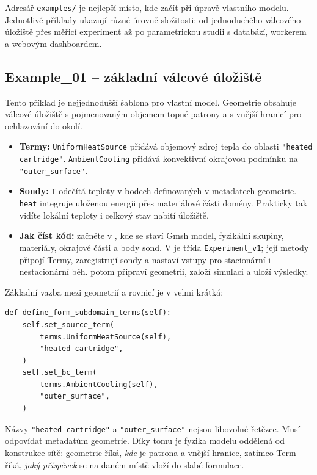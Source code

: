 \documentclass[a4paper,11pt]{article}
\begin{document}
Adresář \texttt{examples/} je nejlepší místo, kde začít při úpravě vlastního
modelu. Jednotlivé příklady ukazují různé úrovně složitosti: od jednoduchého
válcového úložiště přes měřicí experiment až po parametrickou studii s databází,
workerem a webovým dashboardem.

\subsection*{Example\_01 -- základní válcové úložiště}

Tento příklad je nejjednodušší šablona pro vlastní model. Geometrie obsahuje
válcové úložiště s pojmenovaným objemem topné patrony a s vnější hranicí pro
ochlazování do okolí.

\begin{itemize}
  \item \textbf{Termy:} \texttt{UniformHeatSource} přidává objemový zdroj tepla
        do oblasti \texttt{"heated cartridge"}. \texttt{AmbientCooling} přidává
        konvektivní okrajovou podmínku na \texttt{"outer\_surface"}.
  \item \textbf{Sondy:} \texttt{T} odečítá teploty v bodech definovaných v
        metadatech geometrie. \texttt{heat} integruje uloženou energii přes
        materiálové části domény. Prakticky tak vidíte lokální teploty i celkový
        stav nabití úložiště.
  \item \textbf{Jak číst kód:} začněte v , kde se staví Gmsh
        model, fyzikální skupiny, materiály, okrajové části a body sond. V
         je třída \texttt{Experiment\_v1}; její metody připojí
        Termy, zaregistrují sondy a nastaví vstupy pro stacionární i
        nestacionární běh.  potom připraví geometrii,
        založí simulaci a uloží výsledky.
\end{itemize}

Základní vazba mezi geometrií a rovnicí je v  velmi krátká:

\begin{lstlisting}[style=py]
def define_form_subdomain_terms(self):
    self.set_source_term(
        terms.UniformHeatSource(self),
        "heated cartridge",
    )
    self.set_bc_term(
        terms.AmbientCooling(self),
        "outer_surface",
    )
\end{lstlisting}

Názvy \texttt{"heated cartridge"} a \texttt{"outer\_surface"} nejsou libovolné
řetězce. Musí odpovídat metadatům geometrie. Díky tomu je fyzika modelu oddělená
od konstrukce sítě: geometrie říká, \emph{kde} je patrona a vnější hranice,
zatímco Term říká, \emph{jaký příspěvek} se na daném místě vloží do slabé
formulace.
\end{document}
